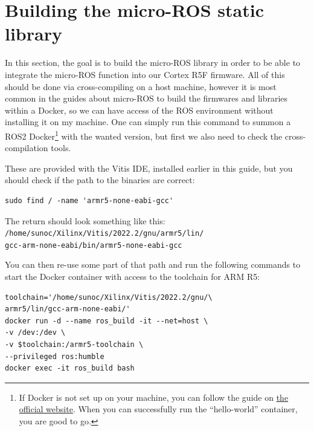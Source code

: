 \documentclass[10pt]{article}
\begin{document}
\section{Building the micro-ROS static library}
\label{sec:building-micro-ros}
In this section, the goal is to build the micro-ROS library in order to be
able to integrate the micro-ROS function into our Cortex R5F firmware.
All of this should be done via cross-compiling on a host machine, however
it is most common in the guides about micro-ROS to build the firmwares and libraries within a Docker,
so we can have access of the ROS environment without installing it on my machine.
One can simply run this command to summon a ROS2 Docker\footnote{If Docker is not set up on your machine, you can follow the guide on \href{https://docs.docker.com/engine/install/ubuntu/}{the official website}. When you can successfully run the ``hello-world'' container, you are good to go.} with the wanted version, but first we also need to check the cross-compilation tools.

These are provided with the Vitis IDE, installed earlier in this guide, but
you should check if the path to the binaries are correct:

\begin{tcolorbox}
\begin{verbatim}
sudo find / -name 'armr5-none-eabi-gcc'
\end{verbatim}
\end{tcolorbox}

The return should look something like this:\\
\verb|/home/sunoc/Xilinx/Vitis/2022.2/gnu/armr5/lin/|\\
\verb|gcc-arm-none-eabi/bin/armr5-none-eabi-gcc|

You can then re-use some part of that path and run the following commands to start the
Docker container with access to the toolchain for ARM R5:
\begin{tcolorbox}
\begin{verbatim}
toolchain='/home/sunoc/Xilinx/Vitis/2022.2/gnu/\
armr5/lin/gcc-arm-none-eabi/'
docker run -d --name ros_build -it --net=host \
-v /dev:/dev \
-v $toolchain:/armr5-toolchain \
--privileged ros:humble
docker exec -it ros_build bash
\end{verbatim}
\end{tcolorbox}
\end{document}
